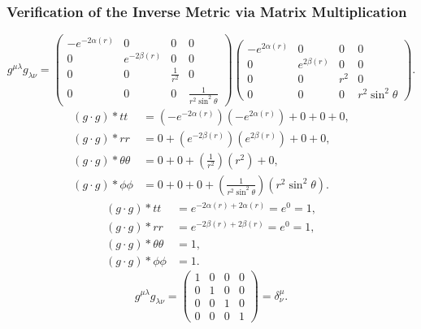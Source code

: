 \documentclass[11pt, a4paper]{report}
\begin{document}
\subsubsection{Verification of the Inverse Metric via Matrix Multiplication}
\begin{equation}
g^{\mu\lambda} g_{\lambda\nu} = \begin{pmatrix}
-e^{-2\alpha(r)} & 0 & 0 & 0 \\
0 & e^{-2\beta(r)} & 0 & 0 \\
0 & 0 & \frac{1}{r^2} & 0 \\
0 & 0 & 0 & \frac{1}{r^2 \sin^2\theta}
\end{pmatrix}
\begin{pmatrix}
-e^{2\alpha(r)} & 0 & 0 & 0 \\
0 & e^{2\beta(r)} & 0 & 0 \\
0 & 0 & r^2 & 0 \\
0 & 0 & 0 & r^2 \sin^2\theta
\end{pmatrix}.
\end{equation}
\begin{align}
(g \cdot g)*{tt} &= \left(-e^{-2\alpha(r)}\right)\left(-e^{2\alpha(r)}\right) + 0 + 0 + 0, \\
(g \cdot g)*{rr} &= 0 + \left(e^{-2\beta(r)}\right)\left(e^{2\beta(r)}\right) + 0 + 0, \\
(g \cdot g)*{\theta\theta} &= 0 + 0 + \left(\frac{1}{r^2}\right)\left(r^2\right) + 0, \\
(g \cdot g)*{\phi\phi} &= 0 + 0 + 0 + \left(\frac{1}{r^2 \sin^2\theta}\right)\left(r^2 \sin^2\theta\right).
\end{align}
\begin{align}
(g \cdot g)*{tt} &= e^{-2\alpha(r) + 2\alpha(r)} = e^0 = 1, \\
(g \cdot g)*{rr} &= e^{-2\beta(r) + 2\beta(r)} = e^0 = 1, \\
(g \cdot g)*{\theta\theta} &= 1, \\
(g \cdot g)*{\phi\phi} &= 1.
\end{align}
\begin{equation}
g^{\mu\lambda} g_{\lambda\nu} = \begin{pmatrix}
1 & 0 & 0 & 0 \\
0 & 1 & 0 & 0 \\
0 & 0 & 1 & 0 \\
0 & 0 & 0 & 1
\end{pmatrix} = \delta^\mu_\nu.
\end{equation}
\end{document}
